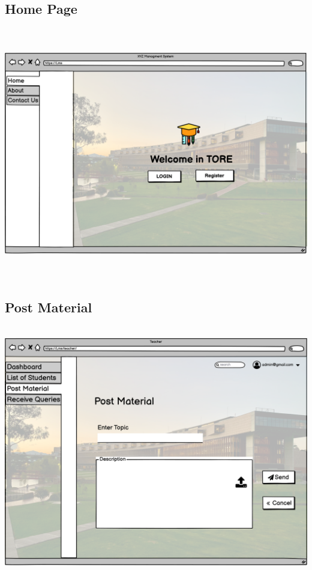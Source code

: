\subsection{Home Page}

\includegraphics[width=18cm, height=11cm]{HW_1/images/New Wireframe 1.png}


\subsection{Post Material}

\includegraphics[width=18cm, height=11cm]{HW_1/images/Post Material.png}

